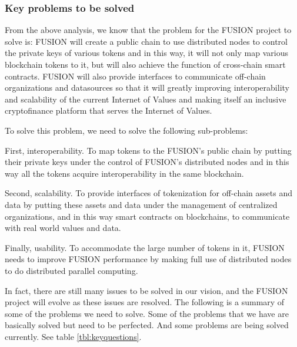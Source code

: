 \documentclass[a4paper,12pt]{article}
\begin{document}
\subsubsection{Key problems to be solved}

From the above analysis, we know that the problem for the FUSION project to solve is: FUSION will create a public chain to use distributed nodes to control the private keys of various tokens and in this way, it will not only map various blockchain tokens to it, but will also achieve the function of cross-chain smart contracts. FUSION will also provide interfaces to communicate off-chain organizations and datasources so that it will greatly improving interoperability and scalability of the current Internet of Values and making itself an inclusive cryptofinance platform that serves the Internet of Values.

To solve this problem, we need to solve the following sub-problems:

First, interoperability. To map tokens to the FUSION's public chain by putting their private keys under the control of FUSION's distributed nodes and in this way all the tokens acquire interoperability in the same blockchain.

Second, scalability. To provide interfaces of tokenization for off-chain assets and data by putting these assets and data under the management of centralized organizations, and in this way smart contracts on blockchains, to communicate with real world values and data.

Finally, usability. To accommodate the large number of tokens in it, FUSION needs to improve FUSION performance by making full use of distributed nodes to do distributed parallel computing.

In fact, there are still many issues to be solved in our vision, and the FUSION project will evolve as these issues are resolved. The following is a summary of some of the problems we need to solve. Some of the problems that we have are basically solved but need to be perfected. And some problems are being solved currently. See table \ref{tbl:keyquestions}.
\end{document}
